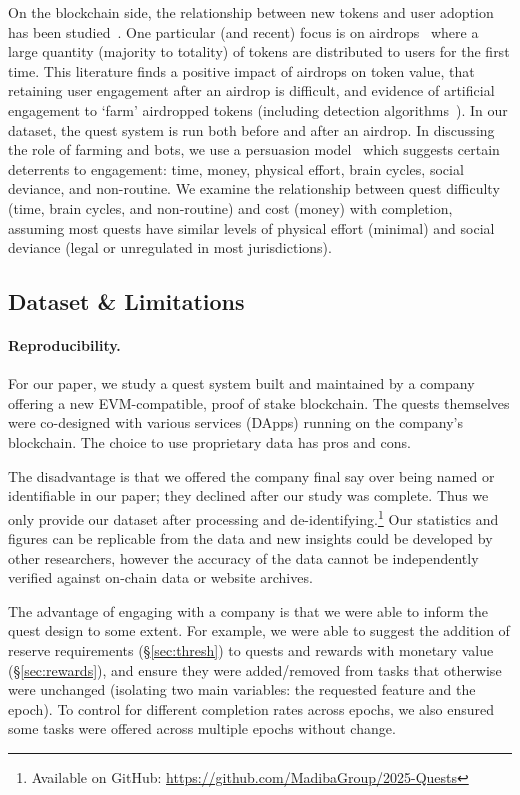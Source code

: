 On the blockchain side, the relationship between new tokens and user adoption has been studied~\cite{BH19}. One particular (and recent) focus is on airdrops~\cite{FB19,MYL24,YL24} where a large quantity (majority to totality) of tokens are distributed to users for the first time. This literature finds a positive impact of airdrops on token value, that retaining user engagement after an airdrop is difficult, and evidence of artificial engagement to `farm' airdropped tokens (including detection algorithms~\cite{FTWC23,ZCH+24}). In our dataset, the quest system is run both before and after an airdrop. In discussing the role of farming and bots, we use a persuasion model~\cite{Fogg09} which suggests certain deterrents to engagement: time, money, physical effort, brain cycles, social deviance, and non-routine. We examine the relationship between quest difficulty (time, brain cycles, and non-routine) and cost (money) with completion, assuming most quests have similar levels of physical effort (minimal) and social deviance (legal or unregulated in most jurisdictions). 


\subsection{Dataset \& Limitations}

\paragraph{Reproducibility.} For our paper, we study a quest system built and maintained by a company offering a new EVM-compatible, proof of stake blockchain. The quests themselves were co-designed with various services (DApps) running on the company's blockchain. The choice to use proprietary data has pros and cons. 

The disadvantage is that we offered the company final say over being named or identifiable in our paper; they declined after our study was complete. Thus we only provide our dataset after processing and de-identifying.\footnote{Available on GitHub: \url{https://github.com/MadibaGroup/2025-Quests}} Our statistics and figures can be replicable from the data and new insights could be developed by other researchers, however the accuracy of the data cannot be independently verified against on-chain data or website archives.

The advantage of engaging with a company is that we were able to inform the quest design to some extent. For example, we were able to suggest the addition of reserve requirements (§\ref{sec:thresh}) to quests and rewards with monetary value (§\ref{sec:rewards}), and ensure they were added/removed from tasks that otherwise were unchanged (isolating two main variables: the requested feature and the epoch). To control for different completion rates across epochs, we also ensured some tasks were offered across multiple epochs without change.

